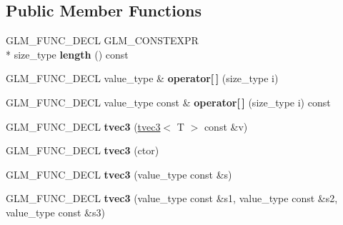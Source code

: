 \subsection*{Public Member Functions}
\begin{DoxyCompactItemize}
\item 
\hypertarget{structglm_1_1detail_1_1tvec3_a1812bf851054fe2281b0378eea31ff95}{G\-L\-M\-\_\-\-F\-U\-N\-C\-\_\-\-D\-E\-C\-L G\-L\-M\-\_\-\-C\-O\-N\-S\-T\-E\-X\-P\-R \\*
size\-\_\-type {\bfseries length} () const }\label{structglm_1_1detail_1_1tvec3_a1812bf851054fe2281b0378eea31ff95}

\item 
\hypertarget{structglm_1_1detail_1_1tvec3_a7bed745d0ba3d0b45a2166d13102ca3e}{G\-L\-M\-\_\-\-F\-U\-N\-C\-\_\-\-D\-E\-C\-L value\-\_\-type \& {\bfseries operator\mbox{[}$\,$\mbox{]}} (size\-\_\-type i)}\label{structglm_1_1detail_1_1tvec3_a7bed745d0ba3d0b45a2166d13102ca3e}

\item 
\hypertarget{structglm_1_1detail_1_1tvec3_a023498363ed653747f9b6a6f8079f7fe}{G\-L\-M\-\_\-\-F\-U\-N\-C\-\_\-\-D\-E\-C\-L value\-\_\-type const \& {\bfseries operator\mbox{[}$\,$\mbox{]}} (size\-\_\-type i) const }\label{structglm_1_1detail_1_1tvec3_a023498363ed653747f9b6a6f8079f7fe}

\item 
\hypertarget{structglm_1_1detail_1_1tvec3_afb5691185de8b87cd4fd5aa34bd9969f}{G\-L\-M\-\_\-\-F\-U\-N\-C\-\_\-\-D\-E\-C\-L {\bfseries tvec3} (\hyperlink{structglm_1_1detail_1_1tvec3}{tvec3}$<$ T $>$ const \&v)}\label{structglm_1_1detail_1_1tvec3_afb5691185de8b87cd4fd5aa34bd9969f}

\item 
\hypertarget{structglm_1_1detail_1_1tvec3_aef556e22396e99fc3b81bca6fd15f594}{G\-L\-M\-\_\-\-F\-U\-N\-C\-\_\-\-D\-E\-C\-L {\bfseries tvec3} (ctor)}\label{structglm_1_1detail_1_1tvec3_aef556e22396e99fc3b81bca6fd15f594}

\item 
\hypertarget{structglm_1_1detail_1_1tvec3_a67da3dd23a3f23f72504bcbfc6f25453}{G\-L\-M\-\_\-\-F\-U\-N\-C\-\_\-\-D\-E\-C\-L {\bfseries tvec3} (value\-\_\-type const \&s)}\label{structglm_1_1detail_1_1tvec3_a67da3dd23a3f23f72504bcbfc6f25453}

\item 
\hypertarget{structglm_1_1detail_1_1tvec3_ae0f58f899d4f07e316ec2f7fb936e4eb}{G\-L\-M\-\_\-\-F\-U\-N\-C\-\_\-\-D\-E\-C\-L {\bfseries tvec3} (value\-\_\-type const \&s1, value\-\_\-type const \&s2, value\-\_\-type const \&s3)}\label{structglm_1_1detail_1_1tvec3_ae0f58f899d4f07e316ec2f7fb936e4eb}


\end{DoxyCompactItemize}
